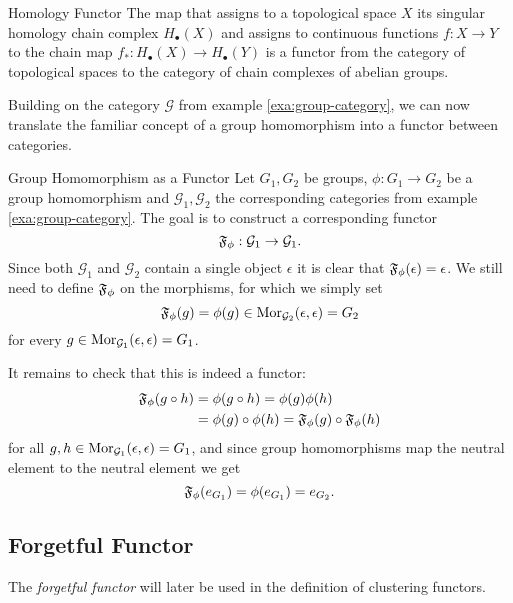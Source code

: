 \begin{example}{Homology Functor \cite[Chap.~2.3]{Hatcher2001}}{}
The map that assigns to a topological space $X$ its singular homology chain complex $H_\bullet(X)$ and assigns to continuous functions $f: X \to Y$ to the chain map $f_*: H_\bullet(X) \to H_\bullet(Y)$ is a functor from the category of topological spaces to the category of chain complexes of abelian groups.
\end{example}

Building on the category $\mathcal{G}$ from example \ref{exa:group-category}, we can now translate the familiar concept of a group homomorphism into a functor between categories.

\begin{example}{Group Homomorphism as a Functor}{}
Let $G_1, G_2$ be groups, $\phi: G_1 \to G_2$ be a group homomorphism and $\mathcal{G}_1,\mathcal{G}_2$ the corresponding categories from example \ref{exa:group-category}. The goal is to construct a corresponding functor 
$$
\mathfrak{F}_\phi: \mathcal{G}_1 \to \mathcal{G}_1.
$$
Since both $\mathcal{G}_1$ and $\mathcal{G}_2$ contain a single object $\epsilon$ it is clear that $\mathfrak{F}_\phi(\epsilon) = \epsilon$. We still need to define $\mathfrak{F}_\phi$ on the morphisms, for which we simply set
$$
\mathfrak{F}_\phi(g) = \phi(g) \in \mathrm {Mor}_{\mathcal{G}_2}(\epsilon, \epsilon) = G_2
$$
for every $g \in \mathrm {Mor}_{\mathcal{G}_1}(\epsilon, \epsilon) = G_1$. \par

\medskip It remains to check that this is indeed a functor:
\begin{equation*}
\begin{split}
\mathfrak{F}_\phi(g \circ h) &= \phi(g \circ h) = \phi(g)\phi(h) \\
&= \phi(g) \circ \phi(h) = \mathfrak{F}_\phi(g) \circ \mathfrak{F}_\phi(h)
\end{split}
\end{equation*}
for all $g,h \in \mathrm {Mor}_{\mathcal{G}_1}(\epsilon, \epsilon) = G_1$, and since group homomorphisms map the neutral element to the neutral element we get
\begin{equation*}
\mathfrak{F}_\phi(e_{G_1}) = \phi(e_{G_1}) = e_{G_2}.
\end{equation*}
\end{example}

\subsection{Forgetful Functor}
The \emph{forgetful functor} will later be used in the definition of clustering functors.

